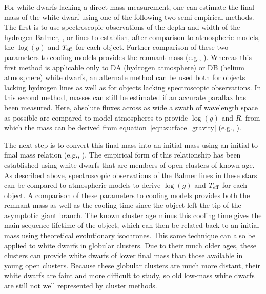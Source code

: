 \documentclass[twocolumn,tighten,twocolappendix]{aastex631}
\begin{document}
For white dwarfs lacking a direct mass measurement, one can estimate the final mass of the white dwarf using one of the following two semi-empirical methods. The first is to use spectroscopic observations of the depth and width of the hydrogen Balmer, , or  lines to establish, after comparison to atmospheric models, the $\log{(g)}$ and $T_{\rm eff}$ for each object. Further comparison of these two parameters to cooling models provides the remnant mass (e.g., \citealt{tremblay2011,genest-beaulieu2019,bergeron1992,finley1997}). Whereas this first method is applicable only to DA (hydrogen atmosphere) or DB (helium atmosphere) white dwarfs, an alternate method can be used both for objects lacking hydrogen lines as well as for objects lacking spectroscopic observations. In this second method, masses can still be estimated if an accurate parallax has been measured. Here, absolute fluxes across as wide a swath of wavelength space as possible are compared to model atmospheres to provide $\log{(g)}$ and $R$, from which the mass can be derived from equation~\ref{eqn:surface_gravity} (e.g., \citealt{bergeron2019, tremblay2019,giammichele2012,bergeron2001,koester1979}).

The next step is to convert this final mass into an initial mass using an initial-to-final mass relation (e.g., \citealt{weidemann2000}). The empirical form of this relationship has been established using white dwarfs that are members of open clusters of known age. As described above, spectroscopic observations of the Balmer lines in these stars can be compared to atmospheric models to derive $\log{(g)}$ and $T_{\rm eff}$ for each object. A comparison of these parameters to cooling models provides both the remnant mass as well as the cooling time since the object left the tip of the asymptotic giant branch. The known cluster age minus this cooling time gives the main sequence lifetime of the object, which can then be related back to an initial mass using theoretical evolutionary isochrones. This same technique can also be applied to white dwarfs in globular clusters. Due to their much older ages, these clusters can provide white dwarfs of lower final mass than those available in young open clusters. Because these globular clusters are much more distant, their white dwarfs are faint and more difficult to study, so old low-mass white dwarfs are still not well represented by cluster methods. 
\end{document}
